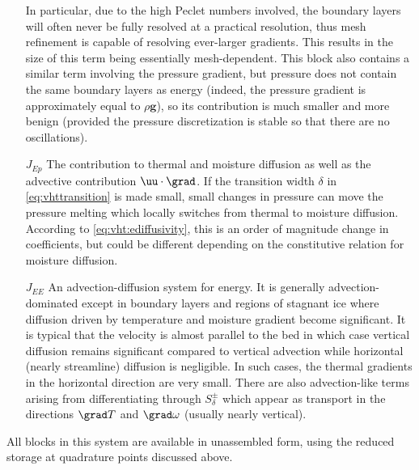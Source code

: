 \begin{itemize}
    In particular, due to the high Peclet numbers involved, the boundary layers will often never be fully resolved at a practical resolution, thus mesh refinement is capable of resolving ever-larger gradients.
    This results in the size of this term being essentially mesh-dependent.
    This block also contains a similar term involving the pressure gradient, but pressure does not contain the same boundary layers as energy (indeed, the pressure gradient is approximately equal to $\rho \bm g$), so its contribution is much smaller and more benign (provided the pressure discretization is stable so that there are no oscillations).
  \item[$J_{Ep}$] The contribution to thermal and moisture diffusion as well as the advective contribution $\uu\cdot \grad$.
    If the transition width $\delta$ in \eqref{eq:vhttransition} is made small, small changes in pressure can move the pressure melting which locally switches from thermal to moisture diffusion.
    According to \eqref{eq:vht:ediffusivity}, this is an order of magnitude change in coefficients, but could be different depending on the constitutive relation for moisture diffusion.
  \item[$J_{EE}$] An advection-diffusion system for energy.
    It is generally advection-dominated except in boundary layers and regions of stagnant ice where diffusion driven by temperature and moisture gradient become significant.
    It is typical that the velocity is almost parallel to the bed in which case vertical diffusion remains significant compared to vertical advection while horizontal (nearly streamline) diffusion is negligible.
    In such cases, the thermal gradients in the horizontal direction are very small.
    There are also advection-like terms arising from differentiating through $S^\pm_\delta$ which appear as transport in the directions $\grad T$ and $\grad \omega$ (usually nearly vertical).
\end{itemize}
All blocks in this system are available in unassembled form, using the reduced storage at quadrature points discussed above.

